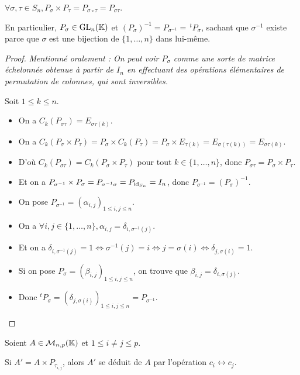 \documentclass[12pt,a4paper]{report}
\begin{document}
\begin{property}
    $\forall \sigma,\tau \in S_n, P_\sigma \times P_\tau = P_{\sigma \circ \tau} = P_{\sigma \tau}$.

    En particulier, $P_\sigma \in \mathrm{GL}_n(\mathbb{K})$ et $(P_\sigma)^{-1} = P_{\sigma^{-1}} = \,^tP_\sigma$, sachant que $\sigma^{-1}$ existe parce que $\sigma$ est une bijection de $\{1,\dots,n\}$ dans lui-même.
\end{property}

\begin{proof}
    \textit{Mentionné oralement : On peut voir $P_\sigma$ comme une sorte de matrice échelonnée obtenue à partir de $I_n$ en effectuant des opérations élémentaires de permutation de colonnes, qui sont inversibles.}

    Soit $1 \le k \le n$.

    \begin{itemize}
        \item On a $C_k(P_{\sigma \tau}) = E_{\sigma \tau(k)}$.
        \item On a $C_k(P_\sigma \times P_\tau) = P_\sigma \times C_k(P_\tau) = P_\sigma \times E_{\tau(k)} = E_{\sigma(\tau(k))} = E_{\sigma \tau(k)}$.
        \item D'où $C_k(P_{\sigma \tau}) = C_k(P_\sigma \times P_\tau)$ pour tout $k \in \{1,\dots,n\}$, donc $P_{\sigma \tau} = P_\sigma \times P_\tau$.
        \item Et on a $P_{\sigma^{-1}} \times P_\sigma = P_{\sigma^{-1} \sigma} = P_{\mathrm{id}_{S_n}} = I_n$, donc $P_{\sigma^{-1}} = (P_\sigma)^{-1}$.
        \item On pose $P_{\sigma^{-1}} = (\alpha_{i,j})_{1 \le i,j \le n}$.
        \item On a $\forall i,j \in \{1,\dots,n\}, \alpha_{i,j} = \delta_{i,\sigma^{-1}(j)}$.
        \item Et on a $\delta_{i,\sigma^{-1}(j)} = 1 \iff \sigma^{-1}(j) = i \iff j = \sigma(i) \iff \delta_{j,\sigma(i)} = 1$.
        \item Si on pose $P_\sigma = (\beta_{i,j})_{1 \le i,j \le n}$, on trouve que $\beta_{i,j} = \delta_{i,\sigma(j)}$.
        \item Donc $^tP_\sigma = (\delta_{j,\sigma(i)})_{1 \le i,j \le n} = P_{\sigma^{-1}}$.
    \end{itemize}
\end{proof}

\begin{property}
    Soient $A \in \mathcal M_{n,p}(\mathbb{K})$ et $1 \le i \ne j \le p$.

    Si $A' = A \times P_{\tau_{i,j}}$, alors $A'$ se déduit de $A$ par l'opération $c_i \leftrightarrow c_j$.
\end{property}
\end{document}
